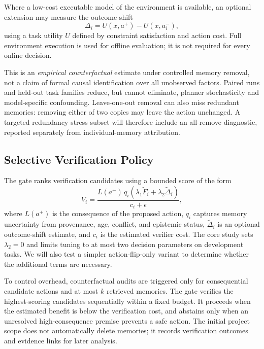 \documentclass[11pt]{article}
\begin{document}
Where a low-cost executable model of the environment is available, an optional extension may measure the outcome shift
\begin{equation}
  \Delta_i=U(x,a^{+})-U(x,a_i^{-}),
\end{equation}
using a task utility $U$ defined by constraint satisfaction and action cost. Full environment execution is used for offline evaluation; it is not required for every online decision.

This is an \emph{empirical counterfactual} estimate under controlled memory removal, not a claim of formal causal identification over all unobserved factors. Paired runs and held-out task families reduce, but cannot eliminate, planner stochasticity and model-specific confounding. Leave-one-out removal can also miss redundant memories: removing either of two copies may leave the action unchanged. A targeted redundancy stress subset will therefore include an all-remove diagnostic, reported separately from individual-memory attribution.

\subsection{Selective Verification Policy}

The gate ranks verification candidates using a bounded score of the form
\begin{equation}
  V_i=\frac{L(a^{+})\,q_i\left(\lambda_1\widetilde{F}_i+
  \lambda_2\widetilde{\Delta}_i\right)}{c_i+\epsilon},
\end{equation}
where $L(a^{+})$ is the consequence of the proposed action, $q_i$ captures memory uncertainty from provenance, age, conflict, and epistemic status, $\widetilde{\Delta}_i$ is an optional outcome-shift estimate, and $c_i$ is the estimated verifier cost. The core study sets $\lambda_2=0$ and limits tuning to at most two decision parameters on development tasks. We will also test a simpler action-flip-only variant to determine whether the additional terms are necessary.

To control overhead, counterfactual audits are triggered only for consequential candidate actions and at most $k$ retrieved memories. The gate verifies the highest-scoring candidates sequentially within a fixed budget. It proceeds when the estimated benefit is below the verification cost, and abstains only when an unresolved high-consequence premise prevents a safe action. The initial project scope does not automatically delete memories; it records verification outcomes and evidence links for later analysis.
\end{document}
